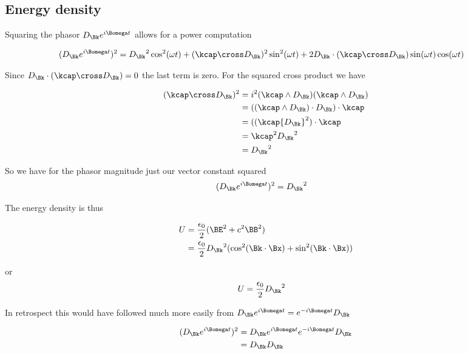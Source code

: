 \subsection{Energy density}

Squaring the phasor $D_\Bk e^{i\Bomega t}$ allows for a power computation

\begin{align*}
(D_\Bk e^{i\Bomega t} )^2
&=
{D_\Bk}^2 \cos^2(\omega t) + (\kcap \cross D_\Bk)^2 \sin^2(\omega t) + 2 D_\Bk \cdot (\kcap \cross D_\Bk) \sin(\omega t) \cos(\omega t)
\end{align*}

Since $D_\Bk \cdot (\kcap \cross D_\Bk) = 0$ the last term is zero.  For the squared cross product we have

\begin{align*}
(\kcap \cross D_\Bk)^2
&= i^2 
(\kcap \wedge D_\Bk) (\kcap \wedge D_\Bk) \\
&= 
((\kcap \wedge D_\Bk) \cdot D_\Bk ) \cdot \kcap  \\
&= 
((\kcap {D_\Bk}^2 ) \cdot \kcap  \\
&= 
\kcap^2 {D_\Bk}^2  \\
&= 
{D_\Bk}^2 
\end{align*}

So we have for the phasor magnitude just our vector constant squared
\begin{align}
(D_\Bk e^{i\Bomega t} )^2
&= 
{D_\Bk}^2 
\end{align}

The energy density is thus

\begin{align*}
U 
&= \frac{\epsilon_0}{2}(\BE^2 + c^2 \BB^2) \\
&= \frac{\epsilon_0}{2} {D_\Bk}^2 ( \cos^2(\Bk \cdot \Bx) +\sin^2(\Bk \cdot \Bx) )
\end{align*}

or
\begin{align}
U &= \frac{\epsilon_0}{2} {D_\Bk}^2 
\end{align}

In retrospect this would have followed much more easily from $D_\Bk e^{i\Bomega t} = e^{-i\Bomega t} D_\Bk$

\begin{align*}
(D_\Bk e^{i\Bomega t} )^2
&=
D_\Bk e^{i\Bomega t} e^{-i\Bomega t} D_\Bk \\
&=
D_\Bk D_\Bk \\
\end{align*}

